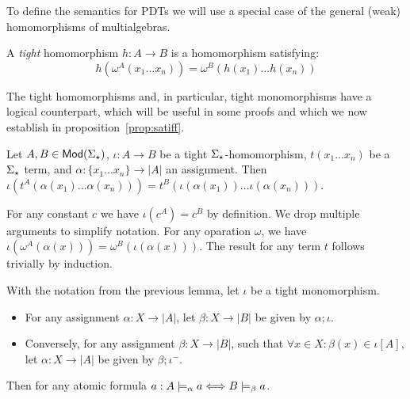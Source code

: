 To define the semantics for PDTs we will use a special case of the general (weak)
homomorphisms of multialgebras.
\begin{definition}
A {\em tight} homomorphism $h:A \to B$ is a homomorphism satisfying:
	\[ h(\omega^A(x_1...x_n)) = \omega^B(h(x_1)...h(x_n)) \]
\end{definition}
The tight homomorphisms and, in particular, tight monomorphisms have a
logical counterpart, which will be useful in some proofs and which we now
establish in proposition~\ref{prop:satiff}.
\begin{lemma}\label{prop:tightpres}
Let $A,B\in{\sf {Mod}}(\Sigma_\star)$, $\iota:A\to B$ be a tight $\Sigma_\star$-homomorphism, 
$t(x_1...x_n)$ be a $\Sigma_\star$ term, and $\alpha:\{x_1...x_n\}\to|A|$ an
assignment. Then $\iota(t^A(\alpha(x_1)...\alpha(x_n)))=t^B(\iota(\alpha(x_1))...\iota(\alpha(x_n)))$.
\end{lemma}
\begin{PROOF}
For any constant $c$ we have $\iota(c^A)=c^B$ by definition. We drop multiple
arguments to simplify notation. For any
oparation $\omega$, we have $\iota(\omega^A(\alpha(x))) =
\omega^B(\iota(\alpha(x)))$. The result for any term $t$ follows trivially by induction. 
\end{PROOF}
\begin{corollary}\label{cor:atomiff}
With the notation from the previous lemma, let $\iota$ be a tight
monomorphism. 
\begin{itemize}\MyLPar
\item For any assignment $\alpha:X\to|A|$, let $\beta:X\to |B|$ be
given by $\alpha;\iota$. 
\item Conversely, for any assignment $\beta:X\to|B|$, such
that $\forall x\in X:\beta(x)\in\iota[A]$, let $\alpha:X\to|A|$ be given by
$\beta;\iota^-$. 
\end{itemize}
Then for any atomic formula $a:A\models_\alpha a\Longleftrightarrow B\models_\beta a$.
\end{corollary}
